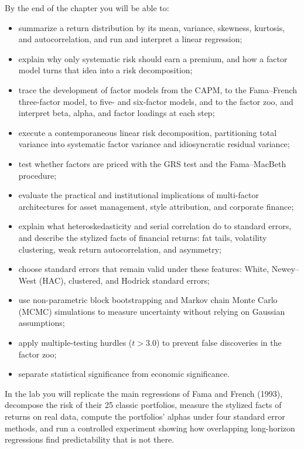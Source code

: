 By the end of the chapter you will be able to:
\begin{itemize}
  \item summarize a return distribution by its mean, variance, skewness, kurtosis, and autocorrelation, and run and interpret a linear regression;
  \item explain why only systematic risk should earn a premium, and how a factor model turns that idea into a risk decomposition;
  \item trace the development of factor models from the CAPM, to the Fama--French three-factor model, to five- and six-factor models, and to the factor zoo, and interpret beta, alpha, and factor loadings at each step;
  \item execute a contemporaneous linear risk decomposition, partitioning total variance into systematic factor variance and idiosyncratic residual variance;
  \item test whether factors are priced with the GRS test and the Fama--MacBeth procedure;
  \item evaluate the practical and institutional implications of multi-factor architectures for asset management, style attribution, and corporate finance;
  \item explain what heteroskedasticity and serial correlation do to standard errors, and describe the stylized facts of financial returns: fat tails, volatility clustering, weak return autocorrelation, and asymmetry;
  \item choose standard errors that remain valid under these features: White, Newey--West (HAC), clustered, and Hodrick standard errors;
  \item use non-parametric block bootstrapping and Markov chain Monte Carlo (MCMC) simulations to measure uncertainty without relying on Gaussian assumptions;
  \item apply multiple-testing hurdles ($t > 3.0$) to prevent false discoveries in the factor zoo;
  \item separate statistical significance from economic significance.
\end{itemize}

In the lab you will replicate the main regressions of Fama and French (1993), decompose the risk of their 25 classic portfolios, measure the stylized facts of returns on real data, compute the portfolios' alphas under four standard error methods, and run a controlled experiment showing how overlapping long-horizon regressions find predictability that is not there.

